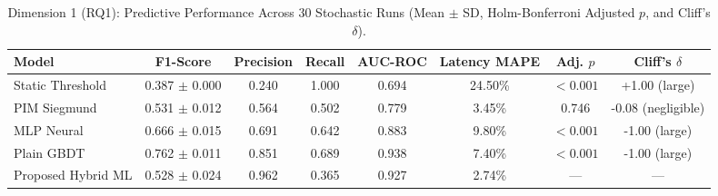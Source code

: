 \begin{table}[t]
\centering
\caption{Dimension 1 (RQ1): Predictive Performance Across 30 Stochastic Runs (Mean $\pm$ SD, Holm-Bonferroni Adjusted $p$, and Cliff's $\delta$).}
\label{tab:res_d1_predictive}
\footnotesize
\begin{tabular}{l c c c c c c c}
\toprule
\textbf{Model} & \textbf{F1-Score} & \textbf{Precision} & \textbf{Recall} & \textbf{AUC-ROC} & \textbf{Latency MAPE} & \textbf{Adj. $p$} & \textbf{Cliff's $\delta$} \\
\midrule
Static Threshold & 0.387 $\pm$ 0.000 & 0.240 & 1.000 & 0.694 & 24.50\% & $<0.001$ & +1.00 (large) \\
PIM Siegmund & 0.531 $\pm$ 0.012 & 0.564 & 0.502 & 0.779 & 3.45\% & 0.746 & -0.08 (negligible) \\
MLP Neural & 0.666 $\pm$ 0.015 & 0.691 & 0.642 & 0.883 & 9.80\% & $<0.001$ & -1.00 (large) \\
Plain GBDT & 0.762 $\pm$ 0.011 & 0.851 & 0.689 & 0.938 & 7.40\% & $<0.001$ & -1.00 (large) \\
Proposed Hybrid ML & 0.528 $\pm$ 0.024 & 0.962 & 0.365 & 0.927 & 2.74\% & --- & --- \\
\bottomrule
\end{tabular}
\end{table}